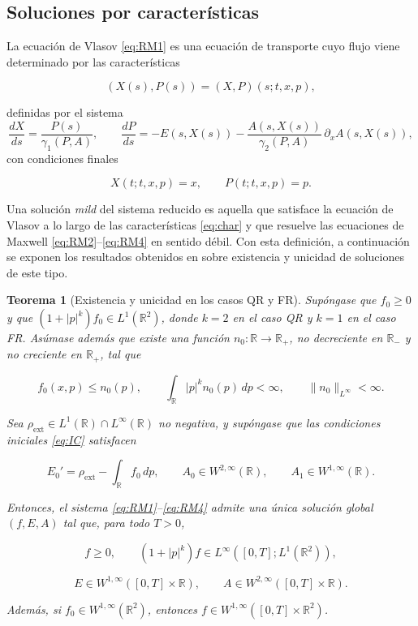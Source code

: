 \documentclass[11pt,a4paper,twoside,pdf]{article}
\numberwithin{equation}{section}
\newtheorem{theorem}{Teorema}[section]
\begin{document}
\subsection{Soluciones por características}

La ecuación de Vlasov \eqref{eq:RM1} es una ecuación de transporte cuyo flujo viene
determinado por las características \cite{romeroedp}


\[
(X(s),P(s)) = (X,P)(s;t,x,p),
\]


definidas por el sistema
\begin{equation}
\frac{dX}{ds} = \frac{P(s)}{\gamma_1(P,A)}, \qquad
\frac{dP}{ds} = -E(s,X(s)) - \frac{A(s,X(s))}{\gamma_2(P,A)}\,\partial_x A(s,X(s)),
\label{eq:char}
\end{equation}
con condiciones finales


\[
X(t;t,x,p)=x, \qquad P(t;t,x,p)=p.
\]



Una solución \emph{mild} del sistema reducido es aquella que satisface la ecuación de
Vlasov a lo largo de las características \eqref{eq:char} y que resuelve las ecuaciones
de Maxwell \eqref{eq:RM2}--\eqref{eq:RM4} en sentido débil. Con esta definición, a continuación se exponen los resultados obtenidos en \cite{bostan2007mild} sobre existencia y unicidad de soluciones de este tipo.



\begin{theorem}[Existencia y unicidad en los casos QR y FR]
Supóngase que $f_0\ge 0$ y que $(1+|p|^k)f_0\in L^1(\mathbb{R}^2)$, donde
$k=2$ en el caso QR y $k=1$ en el caso FR. Asúmase además que existe una función
$n_0:\mathbb{R}\to\mathbb{R}_+$, no decreciente en $\mathbb{R}_-$ y no creciente en
$\mathbb{R}_+$, tal que


\[
f_0(x,p)\le n_0(p), \qquad
\int_{\mathbb{R}} |p|^k n_0(p)\,dp <\infty, \qquad
\|n_0\|_{L^\infty}<\infty.
\]



Sea $\rho_{\mathrm{ext}}\in L^1(\mathbb{R})\cap L^\infty(\mathbb{R})$ no negativa, y supóngase
que las condiciones iniciales \eqref{eq:IC} satisfacen


\[
E_0' = \rho_{\mathrm{ext}} - \int_{\mathbb{R}} f_0\,dp, \qquad
A_0\in W^{2,\infty}(\mathbb{R}), \qquad
A_1\in W^{1,\infty}(\mathbb{R}).
\]



Entonces, el sistema \eqref{eq:RM1}--\eqref{eq:RM4} admite una única solución global
$(f,E,A)$ tal que, para todo $T>0$,


\[
f\ge 0, \qquad
(1+|p|^k)f \in L^\infty([0,T];L^1(\mathbb{R}^2)),
\]




\[
E\in W^{1,\infty}([0,T]\times\mathbb{R}), \qquad
A\in W^{2,\infty}([0,T]\times\mathbb{R}).
\]


Además, si $f_0\in W^{1,\infty}(\mathbb{R}^2)$, entonces $f\in W^{1,\infty}([0,T]\times\mathbb{R}^2)$.
\end{theorem}
\end{document}
